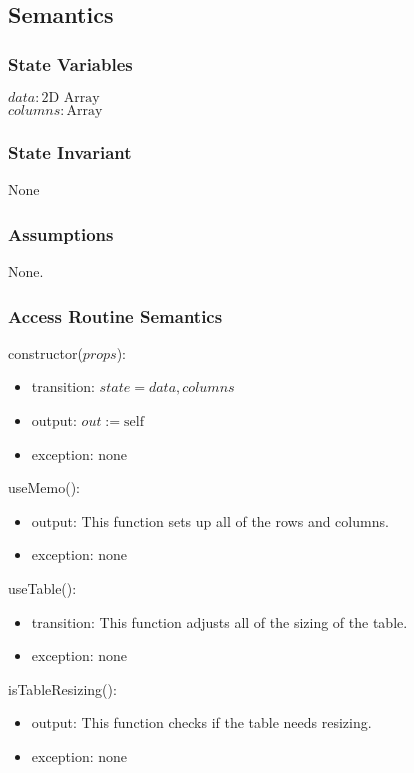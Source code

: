 \documentclass[12pt, titlepage]{article}
\begin{document}
\subsection{Semantics}

\subsubsection{State Variables}

$\mathit{data}: \text{2D Array}$\\
$\mathit{columns}: \text{Array}$

\subsubsection{State Invariant}

None

\subsubsection{Assumptions}

None.

\subsubsection{Access Routine Semantics}

\noindent constructor($props$):
\begin{itemize}
\item transition: $\mathit{state} = data, columns $
\item output: $out := \mbox{self}$
\item exception: none
\end{itemize}

\noindent useMemo():
\begin{itemize}
\item output: This function sets up all of the rows and columns.
\item exception: none
\end{itemize}

\noindent useTable():
\begin{itemize}
\item transition: This function adjusts all of the sizing of the table.
\item exception: none
\end{itemize}

\noindent isTableResizing():
\begin{itemize}
\item output: This function checks if the table needs resizing.
\item exception: none
\end{itemize}
\end{document}
